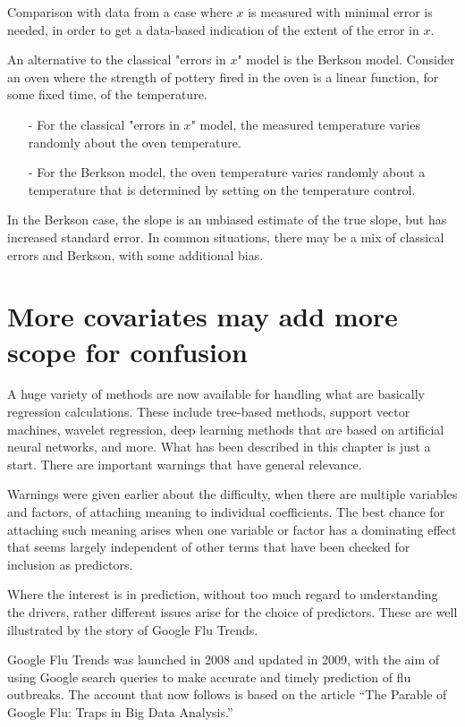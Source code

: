 Comparison with data from a case where $x$ is measured with minimal 
error is needed, in order to get a data-based indication of the extent
of the error in $x$.

An alternative to the classical "errors in $x$" model is the Berkson
model.  Consider an oven where the strength of pottery fired in the
oven is a linear function, for some fixed time, of the temperature.  

\begin{itemize}
\item [-] For the classical "errors in $x$" model, the measured
temperature varies randomly about the oven temperature.
\item[-] For the Berkson model, the oven temperature varies randomly
about a temperature that is determined by setting on the temperature
control.
\end{itemize}

In the Berkson  case, the slope is an unbiased estimate of the true
slope, but has increased standard error.  In common situations, there
may be a mix of classical errors and Berkson, with some additional
bias.

\section{More covariates may add more scope for confusion}

A huge variety of methods are now available for handling what
are basically regression calculations.  These include tree-based
methods, support vector machines, wavelet regression, deep
learning methods that are based on artificial neural networks, 
and more.  What has been described in this chapter is just a
start.  There are important warnings that have general relevance.

Warnings were given earlier about the difficulty, when there
are multiple variables and factors, of attaching meaning to
individual coefficients.  The best chance for attaching
such meaning arises when one variable or factor has a
dominating effect that seems largely independent of other
terms that have been checked for inclusion as predictors.

Where the interest is in prediction, without too much 
regard to understanding the drivers, rather different
issues arise for the choice of predictors.  These are
well illustrated by the story of Google Flu Trends.

Google Flu Trends was launched in 2008 and updated in 2009,
with the aim of using Google search queries to make accurate
and timely prediction of flu outbreaks.  The account that now
follows is based on the \citet{lazerEtAl_GFT_2014} article
``The Parable of Google Flu: Traps in Big Data Analysis.''

